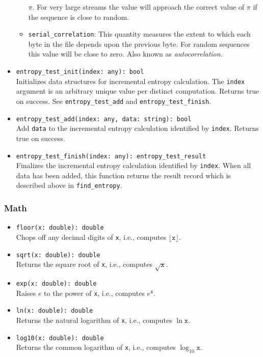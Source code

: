 \documentclass[10pt,landscape]{article}
\newcommand{\ReturnsTrueOnSuccess}{Returns true on success.\xspace}
\begin{document}
\begin{multicols*}{2}
\begin{itemize}
\begin{itemize}
        $\pi$. For very large streams the value will approach the correct value
        of $\pi$ if the sequence is close to random. 
      \item \verb|serial_correlation|: This quantity measures the extent to
        which each byte in the file depends upon the previous byte. For random
        sequences this value will be close to zero. Also known as
        \emph{autocorrelation}.
    \end{itemize}
  \item \verb|entropy_test_init(index: any): bool|\\
    Initializes data structures for incremental entropy calculation. The
    \verb|index| argument is an arbitrary unique value per distinct
    computation.
    \ReturnsTrueOnSuccess
    See \verb|entropy_test_add| and \verb|entropy_test_finish|.
  \item \verb|entropy_test_add(index: any, data: string): bool|\\
    Add \verb|data| to the incremental entropy calculation identified by
    \verb|index|.
    \ReturnsTrueOnSuccess
  \item \verb|entropy_test_finish(index: any): entropy_test_result|\\
    Finalizes the incremental entropy calculation identified by \verb|index|.
    When all data has been added, this function returns the result record which
    is described above in \verb|find_entropy|.
\end{itemize}

\subsubsection*{Math}

\begin{itemize}
  \item \verb|floor(x: double): double|\\
    Chops off any decimal digits of \texttt{x},
    i.e., computes $\lfloor\mathtt{x}\rfloor$.
  \item \verb|sqrt(x: double): double|\\
    Returns the square root of \texttt{x}, i.e., computes $\sqrt{\mathtt{x}}$.
  \item \verb|exp(x: double): double|\\
    Raises $e$ to the power of \texttt{x}, i.e., computes $e^\mathtt{x}$.
  \item \verb|ln(x: double): double|\\
    Returns the natural logarithm of \texttt{x},
    i.e., computes $\ln \mathtt{x}$.
  \item \verb|log10(x: double): double|\\
    Returns the common logarithm of \texttt{x},
    i.e., computes $\log_{10} \mathtt{x}$.
\end{itemize}


\end{multicols*}
\end{document}
